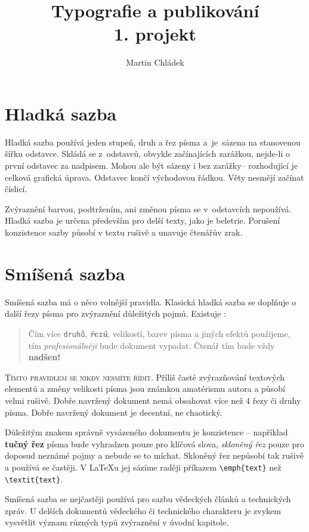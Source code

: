 \documentclass[twocolumn,a4paper]{article}
\title{Typografie a publikování\\
\vspace{10pt}
\large{1. projekt}}
\author{Martin Chládek\\
\email{xchlad16@stud.fit.vutbr.cz}}
\date{}
\begin{document}
\maketitle

\section{Hladká sazba}

Hladká sazba používá jeden stupeň, druh a řez písma a~je~sázena na stanovenou šířku odstavce. Skládá se z~odstavců, obvykle začínajících zarážkou, nejde-li o první odstavec za nadpisem. Mohou ale být sázeny i bez zarážky-- rozhodující je celková grafická úprava. Odstavec končí východovou řádkou. Věty nesmějí začínat číslicí.

Zvýraznění barvou, podtržením, ani změnou písma se v~odstavcích nepoužívá. Hladká sazba je určena především pro delší texty, jako je beletrie. Porušení konzistence sazby působí v textu rušivě a unavuje čtenářův zrak.

\section{Smíšená sazba}
\label{2}
Smíšená sazba má o něco volnější pravidla. Klasická hladká sazba se doplňuje o další řezy písma pro zvýraznění důležitých pojmů. Existuje :

\begin{quotation}
Čím více \texttt{druhů}, \textbf{\emph{řezů}}, {\small velikostí}, barev písma \textsf{a jiných efektů} použijeme, tím \emph{profesionálněji} bude dokument vypadat. Čtenář tím {\tiny bude} vždy \textbf{\huge nadšen!}
\end{quotation}

\textsc{Tímto pravidlem se nikdy nesmíte řídit.} Příliš časté zvýrazňování textových elementů a změny velikosti písma jsou známkou amatérismu autora a působí velmi rušivě. Dobře navržený dokument nemá obsahovat více než
4 řezy či druhy písma. Dobře navržený dokument je decentní, ne chaotický.

Důležitým znakem správně vysázeného dokumentu je konzistence -- například \textbf{tučný řez} písma bude vyhradzen pouze pro klíčová slova, \textsl{skloněný řez} pouze pro doposud neznámé pojmy a nebude se to míchat. Skloněný řez nepůsobí tak rušivě a používá se častěji. V {\LaTeX}u jej sázíme raději příkazem \verb|\emph{text}| než \verb|\textit{text}|.

Smíšená sazba se nejčastěji používá pro sazbu vědeckých článků a technických zpráv. U delších dokumentů vědeckého či technického charakteru je zvykem vysvětlit význam různých typů zvýraznění v úvodní kapitole.
\end{document}
